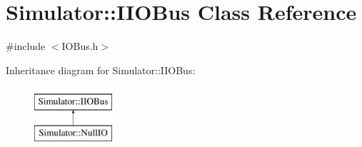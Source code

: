 \hypertarget{class_simulator_1_1_i_i_o_bus}{\section{Simulator\+:\+:I\+I\+O\+Bus Class Reference}
\label{class_simulator_1_1_i_i_o_bus}
}


{\ttfamily \#include $<$I\+O\+Bus.\+h$>$}

Inheritance diagram for Simulator\+:\+:I\+I\+O\+Bus\+:\begin{figure}[H]
\begin{center}
\leavevmode
\includegraphics[height=2.000000cm]{class_simulator_1_1_i_i_o_bus}
\end{center}
\end{figure}
